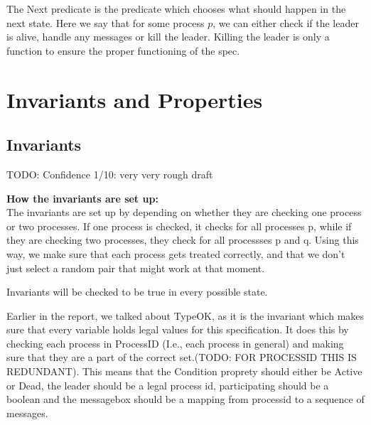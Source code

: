 \documentclass{report}
\begin{document}
The Next predicate is the predicate which chooses what should happen in the next state. Here we say that for some process $p$, we can either check if the leader is alive, handle any messages or kill the leader. Killing the leader is only a function to ensure the proper functioning of the spec.

\section{Invariants and Properties}

\subsection{Invariants}
TODO: Confidence 1/10: very very rough draft


\noindent{}

\textbf{How the invariants are set up:}\\
The invariants are set up by depending on whether they are checking one process or two processes. If one process is checked, it checks for all processes p, while if they are checking two processes, they check for all processses p and q. Using this way, we make sure that each process gets treated correctly, and that we don't just select a random pair that might work at that moment.


Invariants will be checked to be true in every possible state.

Earlier in the report, we talked about TypeOK, as it is the invariant which makes sure that every variable holds legal values for this specification.
It does this by checking each process in ProcessID (I.e., each process in general) and making sure that they are a part of the correct set.(TODO: FOR PROCESSID THIS IS REDUNDANT). This means that the Condition proprety should either be Active or Dead, the leader should be a legal process id, participating should be a boolean and the messagebox should be a mapping from processid to a sequence of messages.
\end{document}
